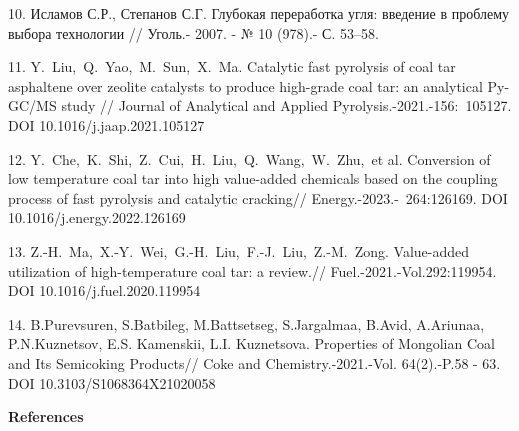 \begin{noparindent}
10. Исламов С.Р., Степанов С.Г. Глубокая переработка угля: введение в
проблему выбора технологии // Уголь.- 2007. - № 10 (978).- С. 53--58.

11. Y.~Liu,~Q.~Yao,~M.~Sun,~X.~Ma. Catalytic fast pyrolysis of coal tar
asphaltene over zeolite catalysts to produce high-grade coal tar: an
analytical Py-GC/MS study // Journal of Analytical and Applied
Pyrolysis.-2021.-156:~105127. DOI 10.1016/j.jaap.2021.105127

12. Y.~Che,~K.~Shi,~Z.~Cui,~H.~Liu,~Q.~Wang,~W.~Zhu,~et al. Conversion
of low temperature coal tar into high value-added chemicals based on the
coupling process of fast pyrolysis and catalytic cracking//
Energy.-2023.-~264:126169. DOI 10.1016/j.energy.2022.126169

13. Z.-H.~Ma,~X.-Y.~Wei,~G.-H.~Liu,~F.-J.~Liu,~Z.-M.~Zong. Value-added
utilization of high-temperature coal tar: a review.//
Fuel.-2021.-Vol.292:119954. DOI 10.1016/j.fuel.2020.119954

14. B.Purevsuren, S.Batbileg, M.Battsetseg, S.Jargalmaa, B.Avid,
A.Ariunaa, P.N.Kuznetsov, E.S. Kamenskii, L.I. Kuznetsova. Properties of
Mongolian Coal and Its Semicoking Products// Coke and
Chemistry.-2021.-Vol. 64(2).-P.58 - 63. DOI 10.3103/S1068364X21020058
\end{noparindent}

\begin{center}
{\bfseries References}
\end{center}

